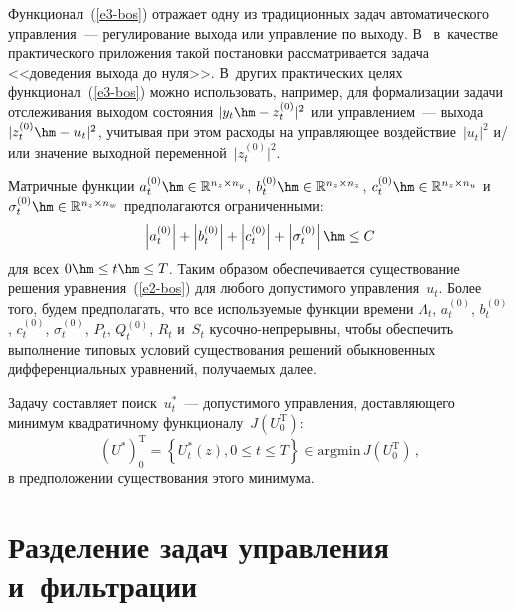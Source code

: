 \begin{multicols}{2}
     Функционал~(\ref{e3-bos}) отражает одну из традиционных задач 
автоматического управления~--- регулирование выхода или управление по 
выходу. В~\cite{12-bos} в~качестве практического приложения такой 
постановки рассматривается задача <<доведения выхода до нуля>>. 
В~других практических целях функционал~(\ref{e3-bos}) можно 
использовать, например, для формализации задачи отслеживания выходом 
состояния $\vert y_t\hm- z_t^{(0)}\vert^2$ или управлением~--- выхода $\vert 
z_t^{(0)}\hm- u_t\vert^2$, учитывая при этом расходы на управляющее 
воздействие~$\vert u_t\vert^2$ и/или значение выходной переменной~$\vert 
z_t^{(0)}\vert^2$.
     
     Матричные функции $a_t^{(0)}\hm\in \mathbb{R}^{n_z\times n_y}$, 
$b_t^{(0)}\hm\in \mathbb{R}^{n_z\times n_z}$, $c_t^{(0)}\hm\in 
\mathbb{R}^{n_z\times n_u}$ и~$\sigma_t^{(0)}\hm\in \mathbb{R}^{n_z\times 
n_w}$ предполагаются ограниченными: 
$$
\left\vert a_t^{(0)}\right\vert + 
\left\vert b_t^{(0)}\right\vert + \left\vert c_t^{(0)}\right\vert + \left\vert 
\sigma_t^{(0)}\right\vert \hm\leq C
$$ 
для всех $0\hm\leq t\hm\leq T$. Таким 
образом обеспечивается существование решения уравнения~(\ref{e2-bos}) 
для любого допустимого управления~$u_t$. Более того, будем предполагать, 
что все используемые функции времени $\Lambda_t$, $a_t^{(0)}$, $b_t^{(0)}$, 
$c_t^{(0)}$, $\sigma_t^{(0)}$, $P_t$, $Q_t^{(0)}$, $R_t$ и~$S_t$  
     ку\-соч\-но-не\-пре\-рыв\-ны, чтобы обеспечить выполнение типовых 
условий существования решений обыкновенных дифференциальных 
уравнений, получаемых далее.
     
     Задачу составляет поиск~$u_t^*$~--- допустимого управ\-ле\-ния, 
доставляющего минимум квадратичному функционалу~$J(U_0^{\mathrm{T}})$: 
     \begin{equation*}
     \left( U^*\right)_0^{\mathrm{T}}=\left\{ U_t^*(z), 0\leq t\leq T\right\} \in 
\mathrm{argmin}\,J(U_0^{\mathrm{T}})\,,
     \end{equation*}
в предположении существования этого минимума.

\section{Разделение задач управления и~фильтрации}


\end{multicols}
